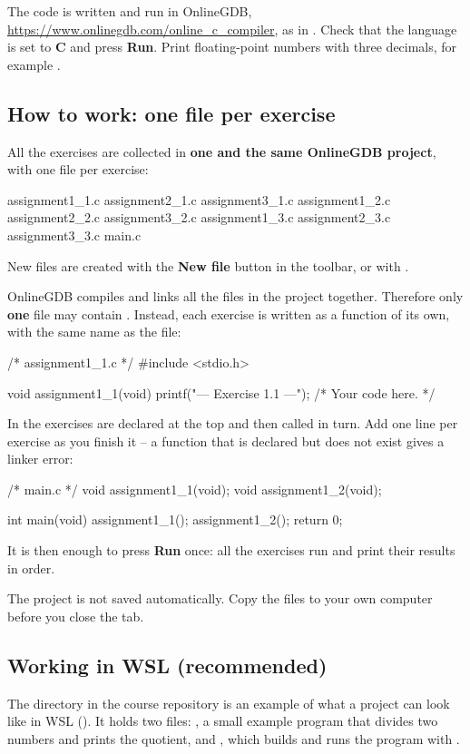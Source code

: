 The code is written and run in OnlineGDB, \url{https://www.onlinegdb.com/online_c_compiler}, as in
. Check that the language is set to \textbf{C} and press \textbf{Run}. Print
floating-point numbers with three decimals, for example .

\subsection*{How to work: one file per exercise}
All the exercises are collected in \textbf{one and the same OnlineGDB project}, with one file per
exercise:
\begin{console}
assignment1_1.c   assignment2_1.c   assignment3_1.c
assignment1_2.c   assignment2_2.c   assignment3_2.c
assignment1_3.c   assignment2_3.c   assignment3_3.c
main.c
\end{console}
New files are created with the \textbf{New file} button in the toolbar, or with .

OnlineGDB compiles and links all the files in the project together. Therefore only \textbf{one}
file may contain . Instead, each exercise is written as a function of its own, with
the same name as the file:
\begin{ccode}
/* assignment1_1.c */
#include <stdio.h>

void assignment1_1(void)
{
    printf("--- Exercise 1.1 ---\n");
    /* Your code here. */
}
\end{ccode}
In  the exercises are declared at the top and then called in turn. Add one line per
exercise as you finish it -- a function that is declared but does not exist gives a linker error:
\begin{ccode}
/* main.c */
void assignment1_1(void);
void assignment1_2(void);

int main(void)
{
    assignment1_1();
    assignment1_2();
    return 0;
}
\end{ccode}
It is then enough to press \textbf{Run} once: all the exercises run and print
their results in order.

\begin{aside}
\note[Note] The project is not saved automatically. Copy the files to your own computer before you
close the tab.
\end{aside}

\subsection*{Working in WSL (recommended)}
The directory  in the course repository is an example of what a
project can look like in WSL (). It holds two files: , a
small example program that divides two numbers and prints the quotient, and ,
which builds and runs the program with .

